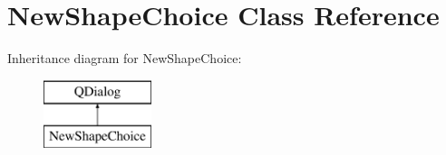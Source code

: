 \hypertarget{class_new_shape_choice}{}\section{New\+Shape\+Choice Class Reference}
\label{class_new_shape_choice}
Inheritance diagram for New\+Shape\+Choice\+:\begin{figure}[H]
\begin{center}
\leavevmode
\includegraphics[height=2.000000cm]{class_new_shape_choice}
\end{center}
\end{figure}
